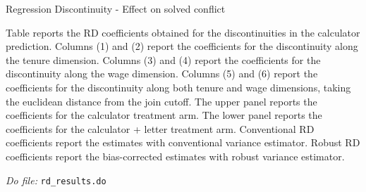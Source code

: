 \documentclass[oneside,11pt]{article}
\begin{document}
\begin{landscape}
\begin{table}[H]
\caption{Regression Discontinuity - Effect on solved conflict}
\label{rd_sett_1}
\begin{center}
\scriptsize{}
\end{center}
\scriptsize{
Table reports the RD coefficients obtained for the discontinuities in the calculator prediction. Columns (1) and (2) report the coefficients for the discontinuity along the tenure dimension. Columns (3) and (4) report the coefficients for the discontinuity along the wage dimension. Columns (5) and (6) report the coefficients for the discontinuity along both tenure and wage dimensions, taking the euclidean distance from the join cutoff. The upper panel reports the coefficients for the calculator treatment arm. The lower panel reports the coefficients for the calculator + letter treatment arm. Conventional RD coefficients report the estimates with conventional variance estimator. Robust RD coefficients report the bias-corrected estimates with robust variance estimator.}

 \scriptsize 
\textit{Do file: } \texttt{rd\_results.do}
\end{table}
\end{landscape}

\newpage
\end{document}
